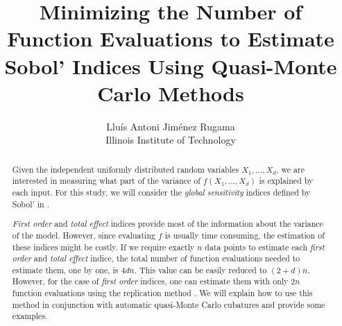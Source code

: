 \documentclass[]{elsarticle}
\theoremstyle{definition}
\begin{document}
\begin{frontmatter}

\title{Minimizing the Number of Function Evaluations to Estimate Sobol' Indices Using Quasi-Monte Carlo Methods}
\author{Llu\'is Antoni Jim\'enez Rugama\\
Illinois Institute of Technology}
\begin{abstract}

Given the independent uniformly distributed random variables $X_1,\dots,X_d$, we are interested in measuring what part of the variance of $f(X_1,\dots,X_d)$ is explained by each input. For this study, we will consider the \emph{global sensitivity} indices defined by Sobol' in \cite{Sobol91}.

\emph{First order} and \emph{total effect} indices provide most of the information about the variance of the model. However, since evaluating $f$ is usually time consuming, the estimation of these indices might be costly. If we require exactly $n$ data points to estimate each \emph{first order} and \emph{total effect} indice, the total number of function evaluations needed to estimate them, one by one, is $4dn$. This value can be easily reduced to $(2+d)n$. However, for the case of \emph{first order} indices, one can estimate them with only $2n$ function evaluations using the replication method \cite{Gilquin15}. We will explain how to use this method in conjunction with automatic quasi-Monte Carlo cubatures \cite{HicJim16a,JimHic16a} and provide some examples.

\end{abstract}

%

\end{frontmatter}


%

\end{document}
